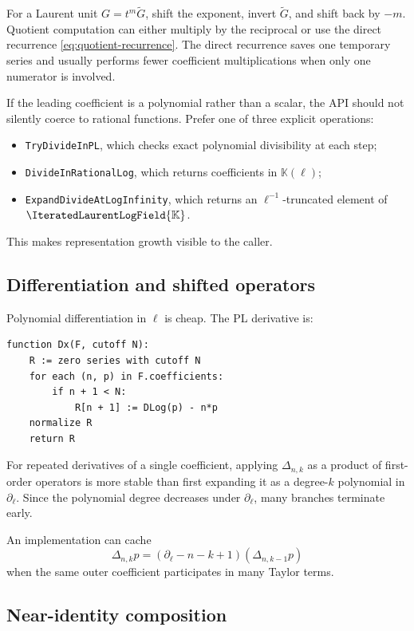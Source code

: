 \documentclass[11pt,oneside]{article}
\numberwithin{equation}{section}
\theoremstyle{definition}
\newcommand{\K}{\mathbb{K}}
\newcommand{\HL}{\IteratedLaurentLogField{\K}}
\newcommand{\dlog}{\partial_{\ell}}
\begin{document}
For a Laurent unit \(G=t^m\widetilde G\), shift the exponent, invert
\(\widetilde G\), and shift back by \(-m\).  Quotient computation can either
multiply by the reciprocal or use the direct recurrence
\eqref{eq:quotient-recurrence}.  The direct recurrence saves one temporary
series and usually performs fewer coefficient multiplications when only one
numerator is involved.

If the leading coefficient is a polynomial rather than a scalar, the API should
not silently coerce to rational functions.  Prefer one of three explicit
operations:
\begin{itemize}
\item \texttt{TryDivideInPL}, which checks exact polynomial divisibility at each
  step;
\item \texttt{DivideInRationalLog}, which returns coefficients in \(\K(\ell)\);
\item \texttt{ExpandDivideAtLogInfinity}, which returns an \(\ell^{-1}\)-truncated
  element of \(\HL\).
\end{itemize}
This makes representation growth visible to the caller.

\subsection{Differentiation and shifted operators}

Polynomial differentiation in \(\ell\) is cheap.  The PL derivative is:

\begin{lstlisting}[style=pseudocode,caption={Differentiation in the large variable \(x\).}]
function Dx(F, cutoff N):
    R := zero series with cutoff N
    for each (n, p) in F.coefficients:
        if n + 1 < N:
            R[n + 1] := DLog(p) - n*p
    normalize R
    return R
\end{lstlisting}

For repeated derivatives of a single coefficient, applying
\(\Delta_{n,k}\) as a product of first-order operators is more stable than first
expanding it as a degree-\(k\) polynomial in \(\dlog\).  Since the polynomial
degree decreases under \(\dlog\), many branches terminate early.

An implementation can cache
\[
  \Delta_{n,k}p=(\dlog-n-k+1)(\Delta_{n,k-1}p)
\]
when the same outer coefficient participates in many Taylor terms.

\subsection{Near-identity composition}
\end{document}
